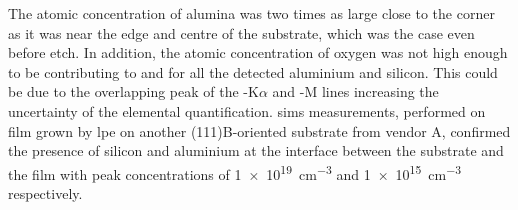 The atomic concentration of alumina was two times as large close to the corner as it was near the edge and centre of the substrate, which was the case even before etch. In addition, the atomic concentration of oxygen was not high enough to be contributing to  and  for all the detected aluminium and silicon. This could be due to the overlapping peak of the -K$\alpha$ and -M lines increasing the uncertainty of the elemental quantification. \Ac{sims} measurements, performed on  film grown by \ac{lpe} on another (111)B-oriented substrate from vendor A, confirmed the presence of silicon and aluminium at the interface between the substrate and the film with peak concentrations of \SI{1e19}{\centi\metre^{-3}} and \SI{1e15}{\centi\metre^{-3}} respectively.


